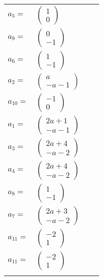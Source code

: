\documentclass[1p]{elsarticle_modified}
\theoremstyle{definition}
\begin{document}
\begin{tabular}{m{7pt} m{180pt} m{7pt} m{180pt} }
\flushright $a_{5}=$&$\begin{pmatrix}1\\0\end{pmatrix}$ \\
\flushright $a_{9}=$&$\begin{pmatrix}0\\-1\end{pmatrix}$ \\
\flushright $a_{6}=$&$\begin{pmatrix}1\\-1\end{pmatrix}$ \\
\flushright $a_{2}=$&$\begin{pmatrix}a\\- a-1\end{pmatrix}$ \\
\flushright $a_{10}=$&$\begin{pmatrix}-1\\0\end{pmatrix}$ \\
\flushright $a_{1}=$&$\begin{pmatrix}2 a+1\\- a-1\end{pmatrix}$ \\
\flushright $a_{3}=$&$\begin{pmatrix}2 a+4\\- a-2\end{pmatrix}$ \\
\flushright $a_{4}=$&$\begin{pmatrix}2 a+4\\- a-2\end{pmatrix}$ \\
\flushright $a_{8}=$&$\begin{pmatrix}1\\-1\end{pmatrix}$ \\
\flushright $a_{7}=$&$\begin{pmatrix}2 a+3\\- a-2\end{pmatrix}$ \\
\flushright $a_{11}=$&$\begin{pmatrix}-2\\1\end{pmatrix}$\\ \flushright $a_{11}=$&$\begin{pmatrix}-2\\1\end{pmatrix}$\\&\end{tabular}
\end{document}

